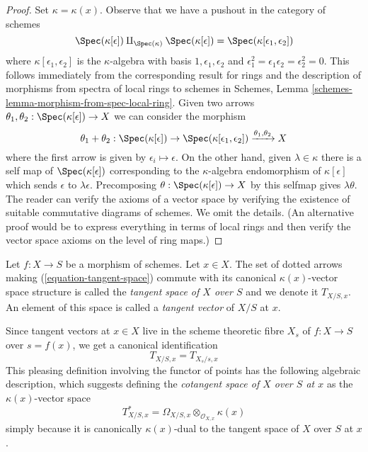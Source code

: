 \begin{proof}
Set $\kappa = \kappa(x)$. Observe that we have a pushout in the
category of schemes
$$
\Spec(\kappa[\epsilon]) \amalg_{\Spec(\kappa)} \Spec(\kappa[\epsilon])
= \Spec(\kappa[\epsilon_1, \epsilon_2])
$$
where $\kappa[\epsilon_1, \epsilon_2]$ is the $\kappa$-algebra with
basis $1, \epsilon_1, \epsilon_2$ and
$\epsilon_1^2 = \epsilon_1\epsilon_2 = \epsilon_2^2 = 0$.
This follows immediately from the corresponding result for
rings and the description of morphisms from spectra of local rings
to schemes in
Schemes, Lemma \ref{schemes-lemma-morphism-from-spec-local-ring}.
Given two arrows
$\theta_1, \theta_2 : \Spec(\kappa[\epsilon]) \to X$
we can consider the morphism
$$
\theta_1 + \theta_2 :
\Spec(\kappa[\epsilon]) \to
\Spec(\kappa[\epsilon_1, \epsilon_2])
\xrightarrow{\theta_1, \theta_2} X
$$
where the first arrow is given by $\epsilon_i \mapsto \epsilon$.
On the other hand, given $\lambda \in \kappa$ there is a self map
of $\Spec(\kappa[\epsilon])$ corresponding to the $\kappa$-algebra
endomorphism of $\kappa[\epsilon]$ which sends $\epsilon$ to $\lambda \epsilon$.
Precomposing $\theta : \Spec(\kappa[\epsilon]) \to X$
by this selfmap gives $\lambda \theta$. The reader can verify
the axioms of a vector space by verifying the existence
of suitable commutative diagrams of schemes. We omit the details.
(An alternative proof would be to express everything in terms of local
rings and then verify the vector space axioms on the level of ring maps.)
\end{proof}

\begin{definition}
\label{definition-tangent-space}
Let $f : X \to S$ be a morphism of schemes. Let $x \in X$. The set of
dotted arrows making (\ref{equation-tangent-space}) commute with
its canonical $\kappa(x)$-vector space structure is called
the {\it tangent space of $X$ over $S$} and we denote it $T_{X/S, x}$.
An element of this space is called a {\it tangent vector} of $X/S$ at $x$.
\end{definition}

\noindent
Since tangent vectors at $x \in X$ live in the scheme theoretic fibre
$X_s$ of $f : X \to S$ over $s = f(x)$, we get a canonical identification
\begin{equation}
\label{equation-tangent-space-fibre}
T_{X/S, x} = T_{X_s/s, x}
\end{equation}
This pleasing definition involving the functor of points has the following
algebraic description, which suggests defining the
{\it cotangent space of $X$ over $S$ at $x$} as the $\kappa(x)$-vector
space
$$
T^*_{X/S, x} = \Omega_{X/S, x} \otimes_{\mathcal{O}_{X, x}} \kappa(x)
$$
simply because it is canonically $\kappa(x)$-dual to the tangent space of
$X$ over $S$ at $x$.

